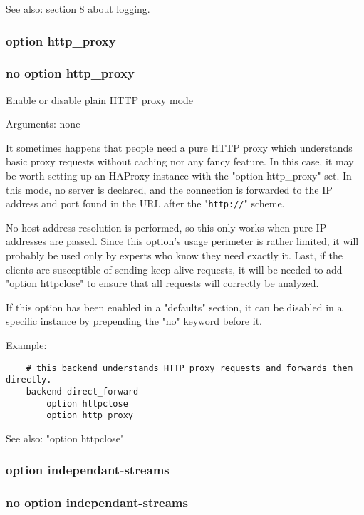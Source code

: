   See also:  section 8 about logging.

\subsubsection{option http\_proxy}
\subsubsection{no option http\_proxy}


  Enable or disable plain HTTP proxy mode

                                 
  Arguments: none

  It sometimes happens that people need a pure HTTP proxy which understands
  basic proxy requests without caching nor any fancy feature. In this case,
  it may be worth setting up an HAProxy instance with the "option http\_proxy"
  set. In this mode, no server is declared, and the connection is forwarded to
  the IP address and port found in the URL after the "\verb|http://|" scheme.

  No host address resolution is performed, so this only works when pure IP
  addresses are passed. Since this option's usage perimeter is rather limited,
  it will probably be used only by experts who know they need exactly it. Last,
  if the clients are susceptible of sending keep-alive requests, it will be
  needed to add "option httpclose" to ensure that all requests will correctly
  be analyzed.

  If this option has been enabled in a "defaults" section, it can be disabled
  in a specific instance by prepending the "no" keyword before it.

  Example:
\begin{verbatim}
    # this backend understands HTTP proxy requests and forwards them directly.
    backend direct_forward
        option httpclose
        option http_proxy
\end{verbatim}

  See also: "option httpclose"

\subsubsection{option independant-streams}
\subsubsection{no option independant-streams}

